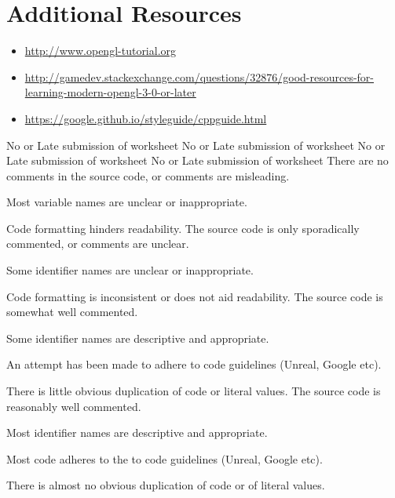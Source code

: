\documentclass{../../fal_assignment}
\begin{document}
\section*{Additional Resources}

\begin{itemize}
    \item \url{http://www.opengl-tutorial.org}
    \item \url{http://gamedev.stackexchange.com/questions/32876/good-resources-for-learning-modern-opengl-3-0-or-later}
    \item \url{https://google.github.io/styleguide/cppguide.html}
\end{itemize}

\rubricyeartwo
\begin{markingrubric}
		\grade\fail No or Late submission of worksheet
		\grade\fail No or Late submission of worksheet
		\grade\fail No or Late submission of worksheet
		\grade\fail No or Late submission of worksheet
\grade\fail There are no comments in the source code, or comments are misleading.
\par Most variable names are unclear or inappropriate.
\par Code formatting hinders readability.
\grade The source code is only sporadically commented, or comments are unclear.
\par Some identifier names are unclear or inappropriate.
\par Code formatting is inconsistent or does not aid readability.
\grade The source code is somewhat well commented.
\par Some identifier names are descriptive and appropriate.
\par An attempt has been made to adhere to code guidelines (Unreal, Google etc).
\par There is little obvious duplication of code or literal values.           
\grade The source code is reasonably well commented.
\par Most identifier names are descriptive and appropriate.
\par Most code adheres to the to code guidelines (Unreal, Google etc).
\par There is almost no obvious duplication of code or of literal values.   

\end{markingrubric}
\end{document}
